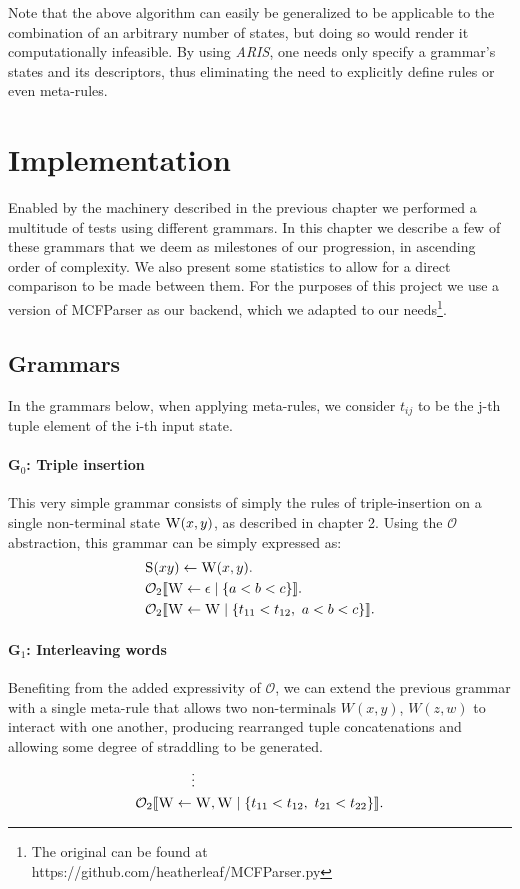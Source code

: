 \documentclass[nonatbib,numbers,10pt]{sigplanconf}
\newcommand\s{\textsc}
\newcommand{\Orderr}[5]{
	\mathcal{#1}_{#5}\llbracket #2 \leftarrow #3 \mid \{ #4 \} \rrbracket.
}
\newcommand{\Or}[4]{\Orderr{O}{#1}{#2}{#3}{#4}}
\begin{document}
Note that the above algorithm can easily be generalized to be applicable to the combination of an arbitrary number of states, but doing so would render it computationally infeasible. By using \textit{ARIS}, one needs only specify a grammar's states and its descriptors, thus eliminating the need to explicitly define rules or even meta-rules.

\section{Implementation}\label{sec3}
Enabled by the machinery described in the previous chapter we performed a multitude of tests using different grammars. In this chapter we describe a few of these grammars that we deem as milestones of our progression, in ascending order of complexity. We also present some statistics to allow for a direct comparison to be made between them. For the purposes of this project we use a version of MCFParser \cite{ljunglof} as our backend, which we adapted to our needs\footnote{The original can be found at https://github.com/heatherleaf/MCFParser.py}.
\subsection{Grammars}
In the grammars below, when applying meta-rules, we consider $t_{ij}$ to be the j-th tuple element of the i-th input state.
\paragraph{G$_0$: Triple insertion}
This very simple grammar consists of simply the rules of triple-insertion on a single non-terminal state $\s{W}(x,y)$, as described in chapter 2. Using the $\mathcal{O}$ abstraction, this grammar can be simply expressed as:
\begin{align*}
&\s{S}(xy) \leftarrow \s{W}(x,y). \\
&\Or{\s{W}}{\epsilon}{a < b < c}{2} \\
&\Or{\s{W}}{\s{W}}{t_{11} < t_{12},\ a < b < c}{2}
\end{align*}
\paragraph{G$_1$: Interleaving words}
Benefiting from the added expressivity of $\mathcal{O}$, we can extend the previous grammar with a single meta-rule that allows two non-terminals $W(x,y)$, $W(z,w)$ to interact with one another, producing rearranged tuple concatenations and allowing some degree of straddling to be generated.
\vspace{-\topsep}
\begin{align*}
& \quad\quad\quad\quad \vdots \\
&\Or{\s{W}}{\s{W}, \s{W}}{t_{11} < t_{12},\ t_{21} < t_{22}}{2}
\end{align*}
\end{document}
